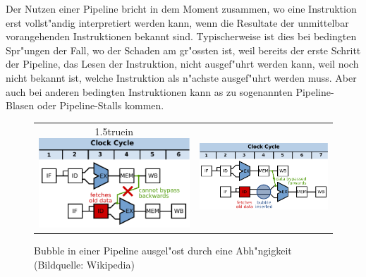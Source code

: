 Der Nutzen einer Pipeline bricht in dem Moment zusammen, wo eine Instruktion
erst vollst"andig interpretiert werden kann, wenn die Resultate
der unmittelbar vorangehenden Instruktionen bekannt sind.
Typischerweise ist dies bei bedingten Spr"ungen der Fall, wo der
Schaden am gr"ossten ist, weil bereits der erste Schritt der Pipeline,
das Lesen der Instruktion, nicht ausgef"uhrt werden kann, weil noch nicht
bekannt ist, welche Instruktion als n"achste ausgef"uhrt werden muss.
Aber auch bei anderen bedingten Instruktionen kann as zu sogenannten
Pipeline-Blasen oder Pipeline-Stalls kommen.
\begin{figure}
\begin{center}
\begin{tabular}{cc}
\begin{minipage}[b]{0.45\hsize}
\vsize1.5truein
\includegraphics[width=\hsize]{images/pipeline1.pdf}
\end{minipage}&
\begin{minipage}[b]{0.45\hsize}
\includegraphics[width=\hsize]{images/pipeline2.pdf}
\phantom{.}
\end{minipage}
\end{tabular}
\end{center}
\caption{Bubble in einer Pipeline ausgel"ost durch eine Abh"ngigkeit
(Bildquelle: Wikipedia)
\label{pipelinestall}}
\end{figure}

